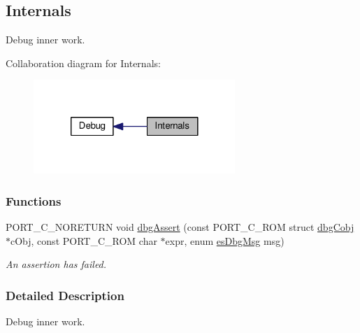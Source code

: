 \hypertarget{group__dbg__impl}{\subsection{Internals}
\label{group__dbg__impl}
}


Debug inner work.  


Collaboration diagram for Internals\-:\nopagebreak
\begin{figure}[H]
\begin{center}
\leavevmode
\includegraphics[width=216pt]{group__dbg__impl}
\end{center}
\end{figure}
\subsubsection*{Functions}
\begin{DoxyCompactItemize}
\item 
P\-O\-R\-T\-\_\-\-C\-\_\-\-N\-O\-R\-E\-T\-U\-R\-N void \hyperlink{group__dbg__impl_ga204facb7daeaa5ae665adf96eed0df8d}{dbg\-Assert} (const P\-O\-R\-T\-\_\-\-C\-\_\-\-R\-O\-M struct \hyperlink{structdbgCobj}{dbg\-Cobj} $\ast$c\-Obj, const P\-O\-R\-T\-\_\-\-C\-\_\-\-R\-O\-M char $\ast$expr, enum \hyperlink{group__dbg__intf_ga571a5933b00f4fdc98d1885a6b0f4613}{es\-Dbg\-Msg} msg)
\begin{DoxyCompactList}\small\item\em An assertion has failed. \end{DoxyCompactList}\end{DoxyCompactItemize}


\subsubsection{Detailed Description}
Debug inner work. 

